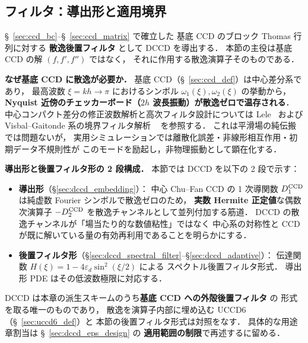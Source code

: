 %
%
\subsection{\DCCD{} フィルタ：導出形と適用境界}
\label{sec:dccd_derivation}
\label{sec:dissipative_ccd}%
\label{sec:dccd_motivation}%
\label{sec:dccd_bc}%
\label{sec:dccd_conservation}%

§~\ref{sec:ccd_bc}--§~\ref{sec:ccd_matrix} で確立した
基底 CCD のブロック Thomas 行列に対する
\textbf{散逸後置フィルタ} として DCCD を導出する．
本節の主役は基底 CCD の解 $(f, f', f'')$ ではなく，
それに作用する散逸演算子そのものである．

\medskip\noindent\textbf{なぜ基底 CCD に散逸が必要か．}
基底 CCD（§~\ref{sec:ccd_def}）は中心差分系であり，
最高波数 $\xi=k h\to\pi$ におけるシンボル
$\omega_1(\xi),\omega_2(\xi)$ の挙動から，
\textbf{Nyquist 近傍のチェッカーボード（$2h$ 波長振動）が散逸ゼロで温存される}．
中心コンパクト差分の修正波数解析と高次フィルタ設計については
Lele~\cite{Lele1992} および Visbal--Gaitonde 系の境界フィルタ解析
~\cite{GaitondeVisbal2000,VisbalGaitonde2002} を参照する．
これは平滑場の純伝搬では問題ないが，
実用シミュレーションでは離散化誤差・非線形相互作用・初期データ不規則性が
このモードを励起し，非物理振動として顕在化する．

\medskip\noindent\textbf{導出形と後置フィルタ形の 2 段構成．}
本節では DCCD を以下の 2 段で示す：
\begin{itemize}[leftmargin=*, itemsep=2pt, topsep=2pt]
  \item \textbf{導出形}（§\ref{sec:dccd_embedding}）：
        中心 Chu--Fan CCD の 1 次導関数 $D_1^{\mathrm{CCD}}$ は純虚数 Fourier シンボルで散逸ゼロのため，
        \textbf{実数 Hermite 正定値}な偶数次演算子 $-D_2^{\mathrm{CCD}}$ を散逸チャンネルとして並列付加する筋道．
        DCCD の散逸チャンネルが「場当たり的な数値粘性」ではなく
        中心系の対称性と CCD が既に解いている量の有効再利用であることを明らかにする．
  \item \textbf{後置フィルタ形}（§\ref{sec:dccd_spectral_filter}--§\ref{sec:dccd_adaptive}）：
        伝達関数 $H(\xi)=1-4\varepsilon_d\sin^2(\xi/2)$ による
        スペクトル後置フィルタ形式．
        導出形 PDE はその低波数極限に対応する．
\end{itemize}
DCCD は本章の派生スキームのうち\textbf{基底 CCD への外殻後置フィルタ} の
形式を取る唯一のものであり，
散逸を演算子内部に埋め込む UCCD6（§~\ref{sec:uccd6_def}）と
本節の後置フィルタ形式は対照をなす．
具体的な用途章割当は §~\ref{sec:dccd_eps_design} の
\textbf{適用範囲の制限}で再述するに留める．

